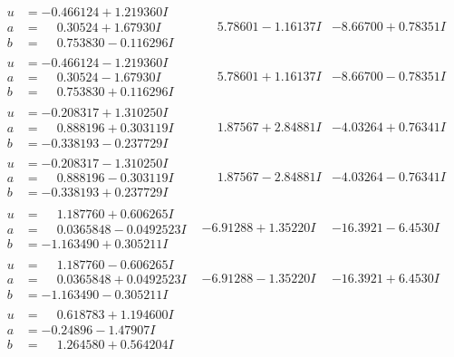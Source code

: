 \documentclass[1p]{elsarticle_modified}
\theoremstyle{definition}
\begin{document}
$$\begin{array}{c|c|c}
\begin{aligned}
u &= -0.466124 + 1.219360 I \\
a &= \phantom{-}0.30524 + 1.67930 I \\
b &= \phantom{-}0.753830 - 0.116296 I\end{aligned}
 & \phantom{-}5.78601 - 1.16137 I & -8.66700 + 0.78351 I \\ \hline\begin{aligned}
u &= -0.466124 - 1.219360 I \\
a &= \phantom{-}0.30524 - 1.67930 I \\
b &= \phantom{-}0.753830 + 0.116296 I\end{aligned}
 & \phantom{-}5.78601 + 1.16137 I & -8.66700 - 0.78351 I \\ \hline\begin{aligned}
u &= -0.208317 + 1.310250 I \\
a &= \phantom{-}0.888196 + 0.303119 I \\
b &= -0.338193 - 0.237729 I\end{aligned}
 & \phantom{-}1.87567 + 2.84881 I & -4.03264 + 0.76341 I \\ \hline\begin{aligned}
u &= -0.208317 - 1.310250 I \\
a &= \phantom{-}0.888196 - 0.303119 I \\
b &= -0.338193 + 0.237729 I\end{aligned}
 & \phantom{-}1.87567 - 2.84881 I & -4.03264 - 0.76341 I \\ \hline\begin{aligned}
u &= \phantom{-}1.187760 + 0.606265 I \\
a &= \phantom{-}0.0365848 - 0.0492523 I \\
b &= -1.163490 + 0.305211 I\end{aligned}
 & -6.91288 + 1.35220 I & -16.3921 - 6.4530 I \\ \hline\begin{aligned}
u &= \phantom{-}1.187760 - 0.606265 I \\
a &= \phantom{-}0.0365848 + 0.0492523 I \\
b &= -1.163490 - 0.305211 I\end{aligned}
 & -6.91288 - 1.35220 I & -16.3921 + 6.4530 I \\ \hline\begin{aligned}
u &= \phantom{-}0.618783 + 1.194600 I \\
a &= -0.24896 - 1.47907 I \\
b &= \phantom{-}1.264580 + 0.564204 I\end{aligned}

\end{array}$$
\end{document}
